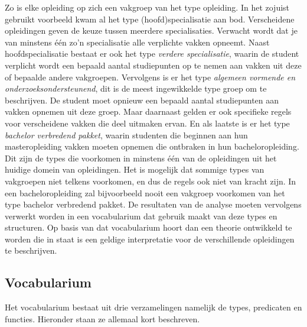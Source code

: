 Zo is elke opleiding op zich een vakgroep van het type opleiding. In het zojuist gebruikt voorbeeld kwam al het type (hoofd)specialisatie aan bod. Verscheidene opleidingen geven de keuze tussen meerdere specialisaties. Verwacht wordt dat je van minstens \'{e}\'{e}n zo'n specialisatie alle verplichte vakken opneemt. Naast hoofdspecialisatie bestaat er ook het type \textit{verdere specialisatie}, waarin de student verplicht wordt een bepaald aantal studiepunten op te nemen aan vakken uit deze of bepaalde andere vakgroepen. Vervolgens is er het type \textit{algemeen vormende en onderzoeksondersteunend}, dit is de meest ingewikkelde type groep om te beschrijven. De student moet opnieuw een bepaald aantal studiepunten aan vakken opnemen uit deze groep. Maar daarnaast gelden er ook specifieke regels voor verscheidene vakken die deel uitmaken ervan. En als laatste is er het type \textit{bachelor verbredend pakket}, waarin studenten die beginnen aan hun masteropleiding vakken moeten opnemen die ontbraken in hun bacheloropleiding. Dit zijn de types die voorkomen in minstens \'{e}\'{e}n van de opleidingen uit het huidige domein van opleidingen. Het is mogelijk dat sommige types van vakgroepen niet telkens voorkomen, en dus de regels ook niet van kracht zijn. In een bacheloropleiding zal bijvoorbeeld nooit een vakgroep voorkomen van het type bachelor verbredend pakket. De resultaten van de analyse moeten vervolgens verwerkt worden in een vocabularium dat gebruik maakt van deze types en structuren. Op basis van dat vocabularium hoort dan een theorie ontwikkeld te worden die in staat is een geldige interpretatie voor de verschillende opleidingen te beschrijven. 

\subsection{Vocabularium}
Het vocabularium bestaat uit drie verzamelingen namelijk de types, predicaten en functies. Hieronder staan ze allemaal kort beschreven.
